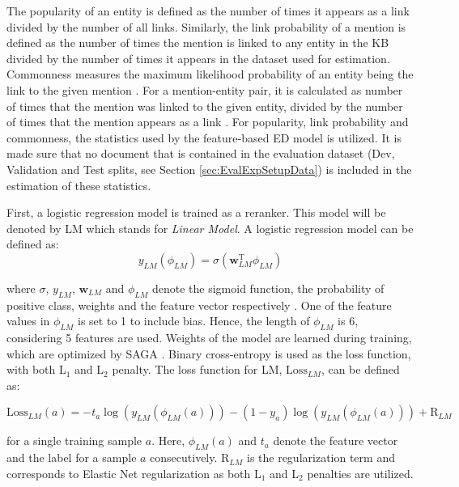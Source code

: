 \documentclass{report}
\theoremstyle{definition}
\theoremstyle{remark}
\begin{document}
The popularity of an entity is defined as the number of times it appears as a link divided by the number of all links. Similarly, the link probability \cite{balog} of a mention is defined as the number of times the mention is linked to any entity in the KB divided by the number of times it appears in the dataset used for estimation. Commonness measures the maximum likelihood probability of an entity being the link to the given mention \cite{balog}. For a mention-entity pair, it is calculated as number of times that the mention was linked to the given entity, divided by the number of times that the mention appears as a link \cite{balog}. For popularity, link probability and commonness, the statistics used by the feature-based ED model is utilized. It is made sure that no document that is contained in the evaluation dataset (Dev, Validation and Test splits, see Section \ref{sec:EvalExpSetupData}) is included in the estimation of these statistics.

First, a logistic regression model is trained as a reranker. This model will be denoted by LM which stands for \textit{Linear Model}. A logistic regression model can be defined as:
\begin{equation}
    y_{LM}(\phi_{LM}) = \sigma(\boldsymbol{w}_{LM}^\text{T} \phi_{LM})
\end{equation}

\noindent where $\sigma$, $y_{LM}$, $\boldsymbol{w}_{LM}$ and $\phi_{LM}$ denote the sigmoid function, the probability of positive class, weights and the feature vector respectively \cite{bishop}. One of the feature values in $\phi_{LM}$ is set to 1 to include bias. Hence, the length of $\phi_{LM}$ is 6, considering 5 features are used. Weights of the model are learned during training, which are optimized by SAGA \cite{saga}. Binary cross-entropy is used as the loss function, with both L$_1$ and L$_2$ penalty. The loss function for LM, $\text{Loss}_{LM}$, can be defined as:

\begin{equation}
 \text{Loss}_{LM}(a) = - t_{a}\log(y_{LM}(\phi_{LM}(a))) - (1-y_{a})\log(y_{LM}(\phi_{LM}(a))) + \text{R}_{LM}
\end{equation}

\noindent for a single training sample $a$. Here, $\phi_{LM}(a)$ and $t_{a}$ denote the feature vector and the label for a sample $a$ consecutively. $\text{R}_{LM}$ is the regularization term and corresponds to Elastic Net regularization \cite{zou2005regularization} as both L$_1$ and L$_2$ penalties are utilized.
\end{document}
